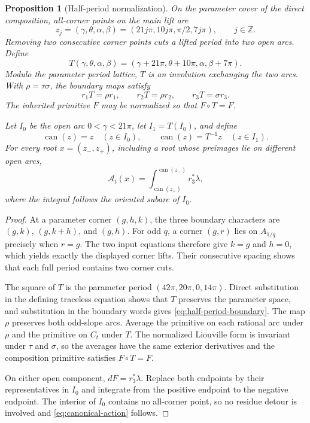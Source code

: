\documentclass[11pt,reqno]{amsart}
\theoremstyle{plain}
\newtheorem{proposition}[theorem]{Proposition}
\theoremstyle{definition}
\newcommand{\Z}{\mathbb{Z}}
\begin{document}
\begin{proposition}[Half-period normalization]\label{prop:half-period}
On the parameter cover of the direct composition, all-corner points on the main lift are
\[
 z_j=(\gamma,\theta,\alpha,\beta)
     =(21j\pi,10j\pi,\pi/2,7j\pi),
 \qquad j\in\Z.
\]
Removing two consecutive corner points cuts a lifted period into two open arcs.  Define
\[
 T(\gamma,\theta,\alpha,\beta)
  =(\gamma+21\pi,\theta+10\pi,\alpha,\beta+7\pi).
\]
Modulo the parameter period lattice, $T$ is an involution exchanging the two arcs.  With
$\rho=\tau\sigma$, the boundary maps satisfy
\begin{equation}\label{eq:half-period-boundary}
 r_1T=\rho r_1,
 \qquad r_2T=\rho r_2,
 \qquad r_3T=\sigma r_3.
\end{equation}
The inherited primitive $F$ may be normalized so that $F\circ T=F$.

Let $I_0$ be the open arc $0<\gamma<21\pi$, let $I_1=T(I_0)$, and define
\[
 \operatorname{can}(z)=z\quad(z\in I_0),
 \qquad
 \operatorname{can}(z)=T^{-1}z\quad(z\in I_1).
\]
For every root $x=(z_-,z_+)$, including a root whose preimages lie on different open arcs,
\begin{equation}\label{eq:canonical-action}
 \mathcal A_t(x)
 =\int_{\operatorname{can}(z_+)}^{\operatorname{can}(z_-)}r_3^*\lambda,
\end{equation}
where the integral follows the oriented subarc of $I_0$.
\end{proposition}

\begin{proof}
At a parameter corner $(g,h,k)$, the three boundary characters are
$(g,k)$, $(g,k+h)$, and $(g,h)$.  For odd $q$, a corner $(g,r)$ lies on $A_{1/q}$ precisely when
$r=g$.  The two input equations therefore give $k=g$ and $h=0$, which yields exactly the displayed
corner lifts.  Their consecutive spacing shows that each full period contains two corner cuts.

The square of $T$ is the parameter period $(42\pi,20\pi,0,14\pi)$.  Direct substitution in the
defining traceless equation shows that $T$ preserves the parameter space, and substitution in the
boundary words gives \eqref{eq:half-period-boundary}.  The map $\rho$ preserves both odd-slope
arcs.  Average the primitive on each rational arc under $\rho$ and the primitive on $C_t$ under
$T$.  The normalized Liouville form is invariant under $\tau$ and $\sigma$, so the averages have
the same exterior derivatives and the composition primitive satisfies $F\circ T=F$.

On either open component, $dF=r_3^*\lambda$.  Replace both endpoints by their representatives in
$I_0$ and integrate from the positive endpoint to the negative endpoint.  The interior of $I_0$
contains no all-corner point, so no residue detour is involved and
\eqref{eq:canonical-action} follows.
\end{proof}
\end{document}
